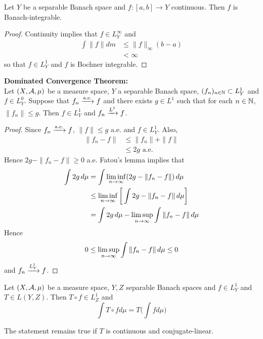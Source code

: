 \documentclass{book}
\begin{document}
	
	\begin{ex}  
	Let $Y$ be a separable Banach space and $f:[a,b] \rightarrow Y$ continuous. Then $f$ is Banach-integrable.
	\end{ex}
	
	\begin{proof}
	Continuity implies that $f \in L_Y^{\infty}$ and 
	\begin{align*}
	\int \| f \| dm 
	&\leq \| f\|_{\infty}(b-a) \\
	&< \infty
\end{align*}
	so that $f \in L^1_Y$ and $f$ is Bochner integrable.
\end{proof}			
	
	\begin{ex}  \textbf{Dominated Convergence Theorem:}\\  
		Let $(X, \mathcal{A}, \mu)$ be a measure space, $Y$ a separable Banach space, $(f_n)_{n \in \mathbb{N}} \subset L^1_Y$ and $f \in L^0_Y$. Suppose that $f_n \xrightarrow{\text{a.e.}} f$ and there exists $g \in L^1$ such that for each $n \in \mathbb{N}$, $\|f_n\| \leq g$. Then $f \in L^1_Y$ and $f_n \xrightarrow{L^1} f$. 
	\end{ex}
	
	\begin{proof}
	Since $f_n \xrightarrow{\text{a.e.}} f$, $\|f\| \leq g$ a.e. and $f \in L^1_Y$. Also, 
	\begin{align*}
	\|f_n - f\| 
	&\leq \|f_n\| + \|f\| \\
	& \leq 2g \text{ a.e.}
	\end{align*}
	Hence $2g - \|f_n - f\| \geq 0$ a.e.
	Fatou's lemma implies that 
	\begin{align*}
	\int 2g \, d \mu 
	&= \int \liminf \limits_{n \rightarrow \infty}(2g - \|f_n - f\|) \, d \mu \\
	&\leq \liminf \limits_{n \rightarrow \infty} \bigg[ \int 2g - \|f_n - f\| \, d \mu \bigg] \\
	&= \int 2g \, d \mu - \limsup \limits_{n \rightarrow \infty} \int \|f_n - f\| \, d \mu
\end{align*}	 
	Hence $$0 \leq \limsup \limits_{n \rightarrow \infty} \int \|f_n - f\| \, d \mu \leq 0$$  and $f_n \xrightarrow{L^1_Y} f$.
	\end{proof}		
	
	\begin{ex}  
	Let $(X, \mathcal{A}, \mu)$ be a measure space, $Y,Z$ separable Banach spaces and $f \in L^1_Y$ and $T \in L(Y,Z)$. Then $T \circ f \in L^1_Z$ and $$\int T \circ f d \mu = T\bigg( \int f d\mu \bigg)$$
	\end{ex}
	
	\begin{note}
	The statement remains true if $T$ is continuous and conjugate-linear. 
	\end{note}
	
\end{document}

